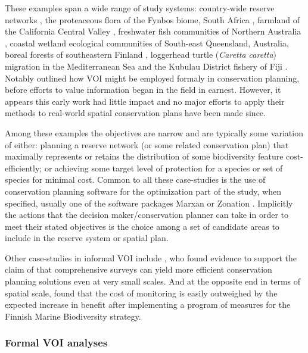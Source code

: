 \documentclass[]{article}
\theoremstyle{definition}
\theoremstyle{definition}
\theoremstyle{definition}
\theoremstyle{remark}
\begin{document}
These examples span a wide range of study systems: country-wide reserve
networks \citep{Balmford1999}, the proteaceous flora of the Fynbos
biome, South Africa \citep{Grantham2008, Grantham2009}, farmland of the
California Central Valley \citep{Stoms2011}, freshwater fish communities
of Northern Australia \citep{Hermoso2013, Hermoso2015}, coastal wetland
ecological communities of South-east Queensland, Australia, boreal
forests of southeastern Finland \citep{Lehtomaki2015}, loggerhead turtle
(\emph{Caretta caretta}) migration in the Mediterranean Sea
\citep{Mazor2016} and the Kubulau District fishery of Fiji
\citep{Tulloch2016}. Notably \citet{Polasky2001} outlined how VOI might
be employed formaly in conservation planning, before efforts to value
information began in the field in earnest. However, it appears this
early work had little impact and no major efforts to apply their methods
to real-world spatial conservation plans have been made since.

Among these examples the objectives are narrow and are typically some
variation of either: planning a reserve network (or some related
conservation plan) that maximally represents or retains the distribution
of some biodiversity feature cost-efficiently; or achieving some target
level of protection for a species or set of species for minimal cost.
Common to all these case-studies is the use of conservation planning
software for the optimization part of the study, when specified, usually
one of the software packages Marxan \citep{Ball2009} or Zonation
\citep{Moilanen2009}. Implicitly the actions that the decision
maker/conservation planner can take in order to meet their stated
objectives is the choice among a set of candidate areas to include in
the reserve system or spatial plan.

Other case-studies in informal VOI include \citet{Perhans2014}, who
found evidence to support the claim of \citet{Balmford1999} that
comprehensive surveys can yield more efficient conservation planning
solutions even at very small scales. And at the opposite end in terms of
spatial scale, \citet{Nygard2016} found that the cost of monitoring is
easily outweighed by the expected increase in benefit after implementing
a program of measures for the Finnish Marine Biodiversity strategy.

\subsubsection*{Formal VOI analyses}\label{formal-voi-analyses}
\end{document}
